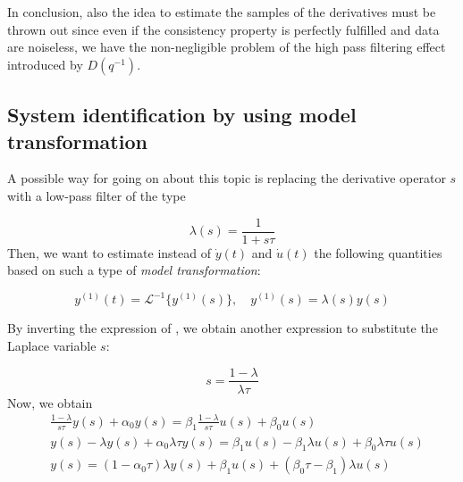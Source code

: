 In conclusion, also the idea to estimate the samples of the derivatives must be thrown out since even if the consistency property is perfectly fulfilled and data are noiseless, we have the non-negligible problem of the high pass filtering effect introduced by $D(q^{-1})$.

\subsection{System identification by using model transformation}
A possible way for going on about this topic is replacing the derivative operator $s$ with a low-pass filter of the type

\begin{equation}\label{eq:lambdat}
    \lambda(s)=\frac{1}{1+s\tau}
\end{equation}
Then, we want to estimate instead of $\dot{y}(t)$ and $\dot{u}(t)$ the following quantities based on such a type of \textit{model transformation}: 

\begin{equation}
    y^{(1)}(t)=\mathcal{L}^{-1}\{y^{(1)}(s)\}, \quad y^{(1)}(s)=\lambda(s)y(s)
\end{equation}

\noindent
By inverting the expression of , we obtain another expression to substitute the Laplace variable $s$:

\begin{equation*}
    s=\frac{1-\lambda}{\lambda\tau}
\end{equation*}
Now, we obtain
\begin{align}
    &\frac{1-\lambda}{s\tau} y(s) + \alpha_0{y(s)}=\beta_1 {\frac{1-\lambda}{s\tau}} u(s) + \beta_0{u(s)}\\
    &y(s)-\lambda{y(s)}+\alpha_0\lambda\tau{y(s)}=\beta_1{u(s)}-\beta_1{\lambda}u(s)+\beta_0\lambda\tau{u(s)}\\
    &y(s)=(1-\alpha_0\tau)\lambda{y(s)} + \beta_1{u(s)}+(\beta_0\tau-\beta_1)\lambda{u(s)}\label{eq: last_step}
\end{align}

